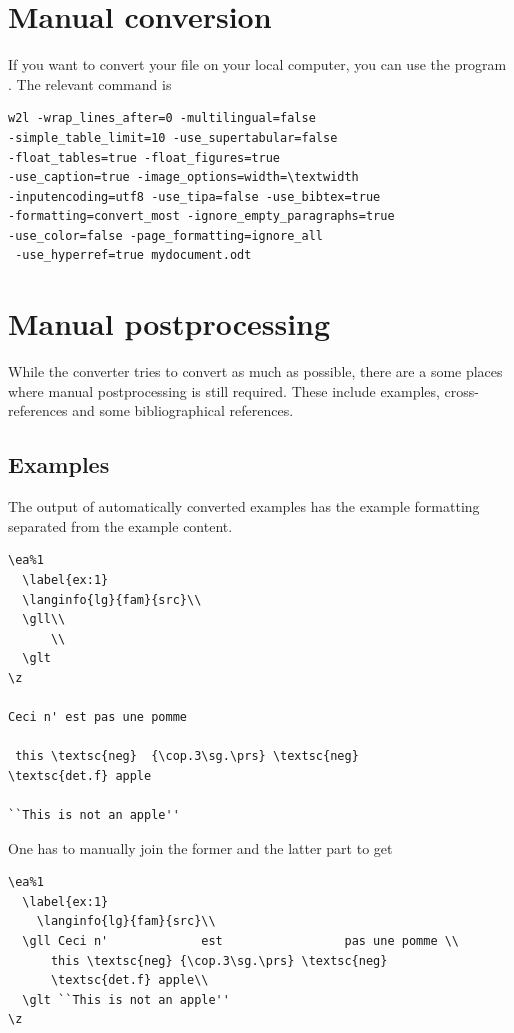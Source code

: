 \section{Manual conversion}
If you want to convert your file on your local computer, you can use the program . The relevant command is 
\begin{verbatim}
w2l -wrap_lines_after=0 -multilingual=false 
-simple_table_limit=10 -use_supertabular=false 
-float_tables=true -float_figures=true 
-use_caption=true -image_options=width=\textwidth 
-inputencoding=utf8 -use_tipa=false -use_bibtex=true  
-formatting=convert_most -ignore_empty_paragraphs=true 
-use_color=false -page_formatting=ignore_all
 -use_hyperref=true mydocument.odt
\end{verbatim}

\section{Manual postprocessing}
While the converter tries to convert as much as possible, there are a some places where manual postprocessing is still required.
These include examples, cross-references and some bibliographical references.

\subsection{Examples}
The output of automatically converted examples has the example formatting separated from the example content.  
\begin{verbatim}
\ea%1
  \label{ex:1}
  \langinfo{lg}{fam}{src}\\
  \gll\\
      \\
  \glt
\z

Ceci n' est pas une pomme

 this \textsc{neg}  {\cop.3\sg.\prs} \textsc{neg}   
\textsc{det.f} apple

``This is not an apple''
\end{verbatim}

One has to manually join the former and the latter part to get

\begin{verbatim}
\ea%1
  \label{ex:1}
    \langinfo{lg}{fam}{src}\\
  \gll Ceci n'             est                 pas une pomme \\
      this \textsc{neg} {\cop.3\sg.\prs} \textsc{neg}   
      \textsc{det.f} apple\\
  \glt ``This is not an apple''
\z 
\end{verbatim} 

